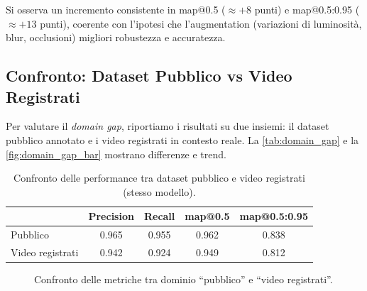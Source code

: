 \documentclass[12pt,a4paper,openright,twoside]{book}
\begin{document}
Si osserva un incremento consistente in \ac{map}@0.5 ($\approx +8$ punti) e \ac{map}@0.5:0.95 ($\approx +13$ punti), 
coerente con l'ipotesi che l'augmentation (variazioni di luminosità, blur, occlusioni) migliori robustezza e accuratezza.

\subsection{Confronto: Dataset Pubblico vs Video Registrati}
Per valutare il \emph{domain gap}, riportiamo i risultati su due insiemi: il dataset pubblico annotato e i video registrati in contesto reale. 
La \autoref{tab:domain_gap} e la \autoref{fig:domain_gap_bar} mostrano differenze e trend.

\begin{table}[t]
  \centering
  \caption{Confronto delle performance tra dataset pubblico e video registrati (stesso modello).}
  \label{tab:domain_gap}
  \begin{tabular}{l S[table-format=1.3] S[table-format=1.3] S[table-format=1.3] S[table-format=1.3]}
    \toprule
    & {\textbf{Precision}} & {\textbf{Recall}} & {\textbf{\ac{map}@0.5}} & {\textbf{\ac{map}@0.5:0.95}} \\
    \midrule
    Pubblico        & 0.965 & 0.955 & 0.962 & 0.838 \\
    Video registrati & 0.942 & 0.924 & 0.949 & 0.812 \\
    \bottomrule
  \end{tabular}
\end{table}

\begin{figure}[t]
  \centering
  \caption{Confronto delle metriche tra dominio ``pubblico'' e ``video registrati''.}
  \label{fig:domain_gap_bar}
\end{figure}
\end{document}
